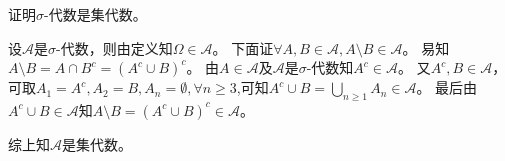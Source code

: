 \documentclass{ctexart}
\newif\ifpreface
\begin{document}
\large
\setlength{\baselineskip}{1.2em}
\ifpreface

\else
\maketitle
\fi
{}
\begin{problem}\label{pro:1.4.1}
  证明\(\sigma \)-代数是集代数。
\end{problem}
\begin{solution}
  设\(\mathcal{A} \)是\(\sigma \)-代数，则由定义知\(\Omega \in \mathcal{A} \)。
  下面证\( \forall A,B \in \mathcal{A},A \setminus B \in \mathcal{A} \)。
  易知\(A \setminus B = A \cap B^c = (A^c \cup B)^c \)。
  由\(A \in \mathcal{A} \)及\(\mathcal{A} \)是\(\sigma \)-代数知\(A^c \in \mathcal{A} \)。
  又\(A^c,B \in \mathcal{A} \)，可取\(A_1=A^c,A_2=B,A_n=\emptyset,\forall n \geq 3 \),可知\(A^c \cup B = \bigcup_{n \geq 1}A_n \in \mathcal{A} \)。
  最后由\(A^c \cup B \in \mathcal{A} \)知\(A \setminus B = (A^c \cup B)^c  \in \mathcal{A}\)。

  综上知\(\mathcal{A} \)是集代数。
\end{solution}
\end{document}
